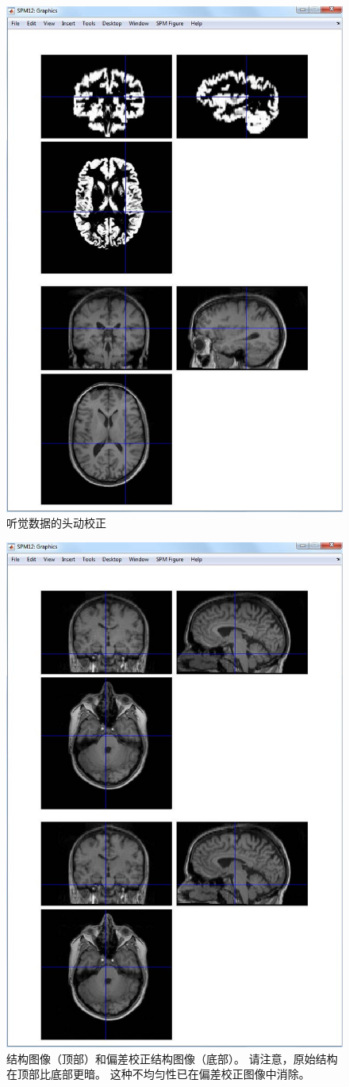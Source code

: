 \begin{figure}[htbp]
	\centering
	\includegraphics[width=0.6\linewidth]{part7/figs/fig_30_5}
	\caption{听觉数据的头动校正}
	\label{gray_matter}
\end{figure}


\begin{figure}[htbp]
	\centering
	\includegraphics[width=0.6\linewidth]{part7/figs/fig_30_6}
	\caption{结构图像（顶部）和偏差校正结构图像（底部）。 请注意，原始结构在顶部比底部更暗。 这种不均匀性已在偏差校正图像中消除。}
	\label{structural_image}
\end{figure}

